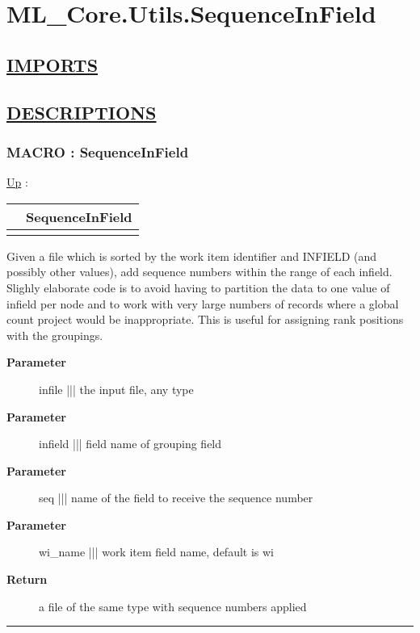 \chapter*{ML\_Core.Utils.SequenceInField}
\hypertarget{ecldoc:toc:ML_Core.Utils.SequenceInField}{}

\section*{\underline{IMPORTS}}

\section*{\underline{DESCRIPTIONS}}
\subsection*{MACRO : SequenceInField}
\hypertarget{ecldoc:ml_core.utils.sequenceinfield}{}
\hyperlink{ecldoc:toc:ML_Core/Utils}{Up} :

{\renewcommand{\arraystretch}{1.5}
\begin{tabularx}{\textwidth}{|>{\raggedright\arraybackslash}l|X|}
\hline
\hspace{0pt} & SequenceInField \\
\hline
\multicolumn{2}{|>{\raggedright\arraybackslash}X|}{\hspace{0pt}(infile,infield,seq,wi\_name='wi')} \\
\hline
\end{tabularx}
}

\par
Given a file which is sorted by the work item identifier and INFIELD (and possibly other values), add sequence numbers within the range of each infield. Slighly elaborate code is to avoid having to partition the data to one value of infield per node and to work with very large numbers of records where a global count project would be inappropriate. This is useful for assigning rank positions with the groupings.

\par
\begin{description}
\item [\textbf{Parameter}] infile ||| the input file, any type
\item [\textbf{Parameter}] infield ||| field name of grouping field
\item [\textbf{Parameter}] seq ||| name of the field to receive the sequence number
\item [\textbf{Parameter}] wi\_name ||| work item field name, default is wi
\item [\textbf{Return}] a file of the same type with sequence numbers applied
\end{description}

\rule{\linewidth}{0.5pt}
